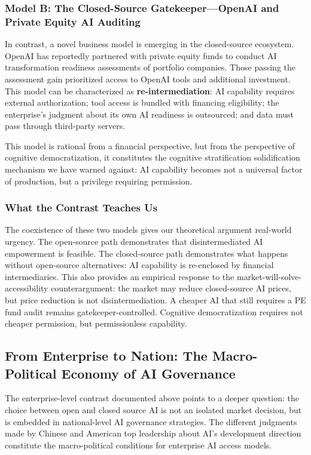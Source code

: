 ﻿\documentclass[12pt,a4paper]{article}
\begin{document}
\subsubsection{Model B: The Closed-Source Gatekeeper---OpenAI and Private Equity AI Auditing}

In contrast, a novel business model is emerging in the closed-source ecosystem. OpenAI has reportedly partnered with private equity funds to conduct AI transformation readiness assessments of portfolio companies. Those passing the assessment gain prioritized access to OpenAI tools and additional investment. This model can be characterized as \textbf{re-intermediation}: AI capability requires external authorization; tool access is bundled with financing eligibility; the enterprise's judgment about its own AI readiness is outsourced; and data must pass through third-party servers.

This model is rational from a financial perspective, but from the perspective of cognitive democratization, it constitutes the cognitive stratification solidification mechanism we have warned against: AI capability becomes not a universal factor of production, but a privilege requiring permission.

\subsubsection{What the Contrast Teaches Us}

The coexistence of these two models gives our theoretical argument real-world urgency. The open-source path demonstrates that disintermediated AI empowerment is feasible. The closed-source path demonstrates what happens without open-source alternatives: AI capability is re-enclosed by financial intermediaries. This also provides an empirical response to the market-will-solve-accessibility counterargument: the market may reduce closed-source AI prices, but price reduction is not disintermediation. A cheaper AI that still requires a PE fund audit remains gatekeeper-controlled. Cognitive democratization requires not cheaper permission, but permissionless capability.


\subsection{From Enterprise to Nation: The Macro-Political Economy of AI Governance}

The enterprise-level contrast documented above points to a deeper question: the choice between open and closed source AI is not an isolated market decision, but is embedded in national-level AI governance strategies. The different judgments made by Chinese and American top leadership about AI's development direction constitute the macro-political conditions for enterprise AI access models.
\end{document}
